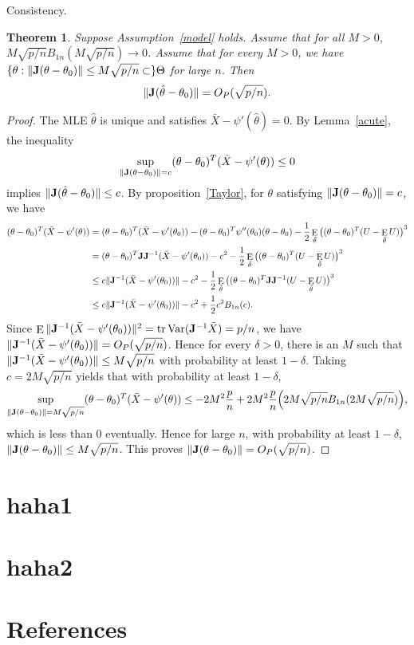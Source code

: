 \documentclass[11pt, letterpaper]{article}
\DeclareMathOperator{\mytr}{tr}
\DeclareMathOperator{\myE}{E}
\DeclareMathOperator{\myVar}{Var}
\theoremstyle{plain}
\newtheorem{theorem}{\quad\quad Theorem}
\theoremstyle{definition}
\theoremstyle{remark}
\begin{document}
Consistency.
\begin{theorem}
    Suppose Assumption~\ref{model} holds.
    Assume that for all $M>0$, $M\sqrt{p/n}B_{1n}(M\sqrt{p/n})\to 0$.
    Assume that for every $M>0$, we have $\{\theta:\|\mathbf{J}(\theta-\theta_0)\|\leq M\sqrt{p/n}\subset \} \Theta$ for large $n$.
    Then
    $$\|\mathbf{J}(\hat{\theta}-\theta_0)\|=O_P(\sqrt{p/n}).$$
\end{theorem}
\begin{proof}
    The MLE $\hat{\theta}$ is unique and satisfies $\bar{X}-\psi'(\hat{\theta})=0$.
    By Lemma~\ref{acute}, the inequality 
    $$\sup_{\|\mathbf{J}(\theta-\theta_0)\|=c}(\theta-\theta_0)^T(\bar{X}-\psi'(\theta))\leq 0$$
    implies $\|\mathbf{J}(\hat{\theta}-\theta_0)\|\leq c$.
    By proposition~\ref{Taylor}, for $\theta$ satisfying $\|\mathbf{J}(\theta-\theta_0)\|=c$, we have
    $$
    \begin{aligned}
        (\theta-\theta_0)^T(\bar{X}-\psi'(\theta))&=
    (\theta-\theta_0)^T(\bar{X}-\psi' (\theta_0))
    -(\theta-\theta_0)^T \psi''(\theta_0)(\theta-\theta_0)
        -\frac{1}{2}\myE_{\tilde\theta}\big((\theta-\theta_0)^T (U-\myE_{\tilde\theta}U)\big)^3\\
        &=
        (\theta-\theta_0)^T \BJ \BJ^{-1}(\bar{X}-\psi' (\theta_0))
        -c^2
        -\frac{1}{2}\myE_{\tilde\theta}\big((\theta-\theta_0)^T (U-\myE_{\tilde\theta}U)\big)^3\\
        &\leq
        c \|\BJ^{-1}(\bar{X}-\psi' (\theta_0))\|
        -c^2
        -\frac{1}{2}\myE_{\tilde\theta}\big((\theta-\theta_0)^T \BJ \BJ^{-1} (U-\myE_{\tilde\theta}U)\big)^3\\
        &\leq
        c \|\BJ^{-1}(\bar{X}-\psi' (\theta_0))\|
        -c^2
        +\frac{1}{2} c^3 B_{1n}(c).
    \end{aligned}
    $$
    Since $\myE\|\BJ^{-1}(\bar{X}-\psi' (\theta_0))\|^2=\mytr \myVar (\BJ^{-1}\bar{X})=p/n$, we have $\|\mathbf{J}^{-1}(\bar{X}-\psi' (\theta_0))\|=O_P(\sqrt{p/n})$.
    Hence for every $\delta>0$, there is an $M$ such that $\|\mathbf{J}^{-1}(\bar{X}-\psi' (\theta_0))\|\leq M\sqrt{p/n}$ with probability at least $1-\delta$.
    Taking $c=2M\sqrt{p/n}$ yields that with probability at least $1-\delta$,
    $$
        \sup_{\|\mathbf{J}(\theta-\theta_0)\|=M\sqrt{p/n}}(\theta-\theta_0)^T(\bar{X}-\psi'(\theta))\leq -2 M^2 \frac{p}{n}+ 2 M^2 \frac{p}{n} \Big(2M\sqrt{p/n}B_{1n}(2M\sqrt{p/n})\Big),
    $$
    which is less than $0$ eventually.
    Hence for large $n$, with probability at least $1-\delta$, $\|\mathbf{J}(\theta-\theta_0)\|\leq M\sqrt{p/n}$.
    This proves $\|\mathbf{J}(\theta-\theta_0)\|=O_P(\sqrt{p/n})$.

\end{proof}






\begin{appendices}
    \section{haha1}
    \section{haha2}
\end{appendices}


\section*{References}



\end{document}
